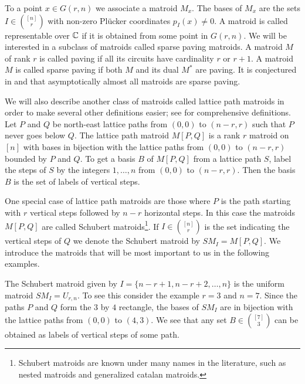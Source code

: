 To a point $x\in G(r,n)$ we associate a matroid $M_x$. The bases of $M_x$ are the sets $I \in \binom{[n]}{r}$ with non-zero Plücker coordinates $p_I(x) \neq 0$. A matroid is called representable over ${\mathbb C}$ if it is obtained from some point in $G(r,n)$. We will be interested in a subclass of matroids called sparse paving matroids. A matroid $M$ of rank $r$ is called paving if all its circuits have cardinality $r$ or $r+1$. A matroid $M$ is called sparse paving if both $M$ and its dual $M^*$ are paving. It is conjectured in \cite{MAYHEW} and \cite{oxleyBook} that asymptotically almost all matroids are sparse paving.

We will also describe another class of matroids called lattice path matroids in order to make several other definitions easier; see \cite{BoninMierNoy} for comprehensive definitions. Let $P$ and $Q$ be north-east lattice paths from $(0,0)$ to $(n-r,r)$ such that $P$ never goes below $Q$. The lattice path matroid $M[P,Q]$ is a rank $r$ matroid on $[n]$ with bases in bijection with the lattice paths from $(0,0)$ to $(n-r,r)$ bounded by $P$ and $Q$. To get a basis $B$ of $M[P,Q]$ from a lattice path $S$, label the steps of $S$ by the integers $1,\dots, n$ from $(0,0)$ to $(n-r,r)$. Then the basis $B$ is the set of labels of vertical steps.

One special case of lattice path matroids are those where $P$ is the path starting with $r$ vertical steps followed by $n-r$ horizontal steps. In this case the matroids $M[P,Q]$ are called Schubert matroids\footnote{Schubert matroids are known under many names in the literature, such as nested matroids and generalized catalan matroids.}. If $I \in \binom{[n]}{r}$ is the set indicating the vertical steps of $Q$ we denote the Schubert matroid by $SM_I = M[P,Q]$. We introduce the matroids that will be most important to us in the following examples.
\begin{example}
    \label{ex:uniform}
    The Schubert matroid given by $I = \{n-r+1,n-r+2,\dots, n\}$ is the uniform matroid $SM_I = U_{r,n}$. To see this consider the example $r=3$ and $n = 7$. Since the paths $P$ and $Q$ form the $3$ by $4$ rectangle, the bases of $SM_I$ are in bijection with the lattice paths from $(0,0)$ to $(4,3)$. We see that any set $B \in \binom{[7]}{3}$ can be obtained as labels of vertical steps of some path.
\end{example}

